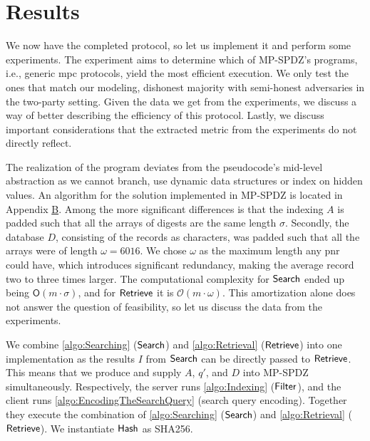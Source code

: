 \section{Results}
\label{sec:proofofconceptResults}

We now have the completed protocol, so let us implement it and perform some experiments. The experiment aims to determine which of MP-SPDZ's programs, i.e., generic \acrshort{mpc} protocols, yield the most efficient execution. We only test the ones that match our modeling, dishonest majority with semi-honest adversaries in the two-party setting. Given the data we get from the experiments, we discuss a way of better describing the efficiency of this protocol. Lastly, we discuss important considerations that the extracted metric from the experiments do not directly reflect.

\newcommand{\BigO}{\ensuremath{\mathsf{{O}}}}
The realization of the program deviates from the pseudocode's mid-level abstraction as we cannot branch, use dynamic data structures or index on hidden values. An algorithm for the solution implemented in MP-SPDZ is located in Appendix \hyperref[apx:proofofconceptSearchRetrieve]{B}. Among the more significant differences is that the indexing $ A $ is padded such that all the arrays of digests are the same length $ \sigma $. Secondly, the database $ D $, consisting of the records as characters, was padded such that all the arrays were of length $ \omega = 6016 $. We chose $ \omega $ as the maximum length any \acrshort{pnr} could have, which introduces significant redundancy, making the average record two to three times larger. The computational complexity for $ \mathsf{{Search}} $ ended up being $ \BigO \left( m \cdot \sigma \right) $, and for $ \mathsf{{Retrieve}} $ it is $ \mathcal{O} \left( m \cdot \omega \right) $. This amortization alone does not answer the question of feasibility, so let us discuss the data from the experiments.

We combine \cref{algo:Searching} ($ \mathsf{{Search}} $) and \cref{algo:Retrieval} ($ \mathsf{{Retrieve}} $) into one implementation as the results $ I $ from $ \mathsf{{Search}} $ can be directly passed to $ \mathsf{{Retrieve}} $. This means that we produce and supply $ A $, $ q' $, and $ D $ into MP-SPDZ simultaneously. Respectively, the server runs \cref{algo:Indexing} ($ \mathsf{{Filter}} $), and the client runs \cref{algo:EncodingTheSearchQuery} (search query encoding). Together they execute the combination of \cref{algo:Searching} ($ \mathsf{{Search}} $) and \cref{algo:Retrieval} ($ \mathsf{{Retrieve}} $). We instantiate $ \mathsf{Hash} $ as SHA256.

